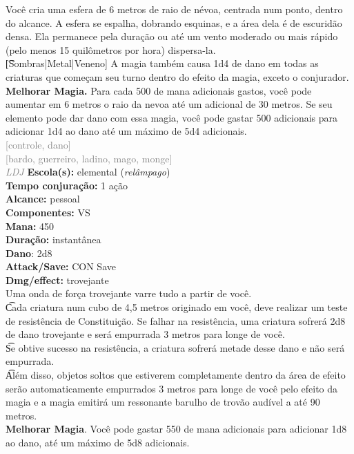 \documentclass{RPG_Adventure}[2021/10/20]
\begin{document}
{\normalsize Você cria uma esfera de 6 metros de raio de névoa, centrada num ponto, dentro do alcance. A esfera se espalha, dobrando esquinas, e a área dela é de escuridão densa. Ela permanece pela duração ou até um vento moderado ou mais rápido (pelo menos 15 quilômetros por hora) dispersa-la.\\\t [Sombras|Metal|Veneno] A magia também causa 1d4 de dano em todas as criaturas que começam seu turno dentro do efeito da magia, exceto o conjurador.\\\t \textbf{Melhorar Magia.} Para cada 500 de mana adicionais gastos, você pode aumentar em 6 metros o raio da nevoa até um adicional de 30 metros. Se seu elemento pode dar dano com essa magia, você pode gastar 500 adicionais para adicionar 1d4 ao dano até um máximo de 5d4 adicionais.\\}
{\scriptsize \textcolor{gray}{[controle, dano]\\}}
{\scriptsize \textcolor{gray}{[bardo, guerreiro, ladino, mago, monge]\\}}
{\tiny \textcolor{gray}{\textit{LDJ}}}\jump{}
{\small \t \textbf{Escola(s):} elemental (\textit{relâmpago})\\\t \textbf{Tempo conjuração:} 1 ação\\\t \textbf{Alcance:} pessoal\\\t \textbf{Componentes:} VS\\\t \textbf{Mana:} 450\\\t \textbf{Duração:} instantânea\\\t \textbf{Dano}: 2d8\\\t \textbf{Attack/Save:} CON Save\\\t \textbf{Dmg/effect:} trovejante\\}
{\normalsize Uma onda de força trovejante varre tudo a partir de você.\\\t Cada criatura num cubo de 4,5 metros originado em você, deve realizar um teste de resistência de Constituição. Se falhar na resistência, uma criatura sofrerá 2d8 de dano trovejante e será empurrada 3 metros para longe de você.\\\t Se obtive sucesso na resistência, a criatura sofrerá metade desse dano e não será empurrada.\\\t Além disso, objetos soltos que estiverem completamente dentro da área de efeito serão automaticamente empurrados 3 metros para longe de você pelo efeito da magia e a magia emitirá um ressonante barulho de trovão audível a até 90 metros.\\\t \textbf{Melhorar Magia}. Você pode gastar 550 de mana adicionais para adicionar 1d8 ao dano, até um máximo de 5d8 adicionais.\\}
\end{document}
